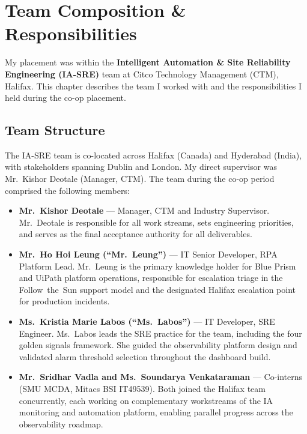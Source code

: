 
\chapter{Team Composition \& Responsibilities}
\label{chap:team}

My placement was within the \textbf{Intelligent Automation \& Site Reliability Engineering (IA-SRE)} team at Citco Technology Management (CTM), Halifax. This chapter describes the team I worked with and the responsibilities I held during the co-op placement.


\FloatBarrier

\section{Team Structure}
\label{sec:team_structure}


The IA-SRE team is co-located across Halifax (Canada) and Hyderabad (India), with stakeholders spanning Dublin and London. My direct supervisor was Mr.\ Kishor Deotale (Manager, CTM). The team during the co-op period comprised the following members:

\begin{itemize}

    \item \textbf{Mr.\ Kishor Deotale} --- Manager, CTM and Industry Supervisor.
          Mr.\ Deotale is responsible for all work streams, sets engineering priorities,
          and serves as the final acceptance authority for all deliverables.

    \item \textbf{Mr.\ Ho Hoi Leung (``Mr.\ Leung'')} --- IT Senior Developer, RPA Platform Lead.
          Mr.\ Leung is the primary knowledge holder for Blue Prism and UiPath
          platform operations, responsible for escalation triage in the
          Follow~the~Sun support model and the designated Halifax
          escalation point for production incidents.

    \item \textbf{Ms.\ Kristia Marie Labos (``Ms.\ Labos'')} --- IT Developer, SRE Engineer.
          Ms.\ Labos leads the SRE practice for the team, including the four
          golden signals framework. She guided the observability platform
          design and validated alarm threshold selection throughout the
          dashboard build.

    \item \textbf{Mr.\ Sridhar Vadla and Ms.\ Soundarya Venkataraman} --- Co-interns
          (SMU MCDA, Mitacs BSI IT49539). Both joined the Halifax team
          concurrently, each working on complementary workstreams of the
          IA monitoring and automation platform, enabling parallel progress
          across the observability roadmap.
\end{itemize}


